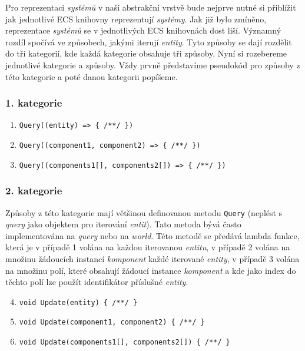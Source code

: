 Pro reprezentaci \textit{systémů} v naší abstrakční vrstvě bude nejprve nutné si přiblížit jak jednotlivé ECS knihovny reprezentují \textit{systémy}. Jak již bylo zmíněno, reprezentace \textit{systémů} se v jednotlivých ECS knihovnách dost liší. Významný rozdíl spočívá ve způsobech, jakými iterují \textit{entity}. Tyto způsoby se dají rozdělit do tří kategorií, kde každá kategorie obsahuje tři způsoby. Nyní si rozebereme jednotlivé kategorie a způsoby. Vždy prvně představíme pseudokód pro způsoby z této kategorie a poté danou kategorii popíšeme.

\subsubsection{1. kategorie}

\begin{enumerate}
    \item \verb|Query((entity) => { /**/ })|
    \item \verb|Query((component1, component2) => { /**/ })|
    \item \verb|Query((components1[], components2[]) => { /**/ })|
\end{enumerate}

\subsubsection{2. kategorie}

Způsoby z této kategorie mají většinou definovanou metodu \verb|Query| (neplést s \textit{query} jako objektem pro iterování \textit{entit}). Tato metoda bývá často implementována na \textit{query} nebo na \textit{world}. Této metodě se předává lambda funkce, která je v případě 1 volána na každou iterovanou \textit{entitu}, v případě 2 volána na množinu žádoucích instancí \textit{komponent} každé iterované \textit{entity}, v případě 3 volána na množinu polí, které obsahují žádoucí instance \textit{komponent} a kde jako index do těchto polí lze použít identifikátor příslušné \textit{entity}.

\begin{enumerate}
    \setcounter{enumi}{3}
    \item \verb|void Update(entity) { /**/ }|
    \item \verb|void Update(component1, component2) { /**/ }|
    \item \verb|void Update(components1[], components2[]) { /**/ }|
\end{enumerate}

